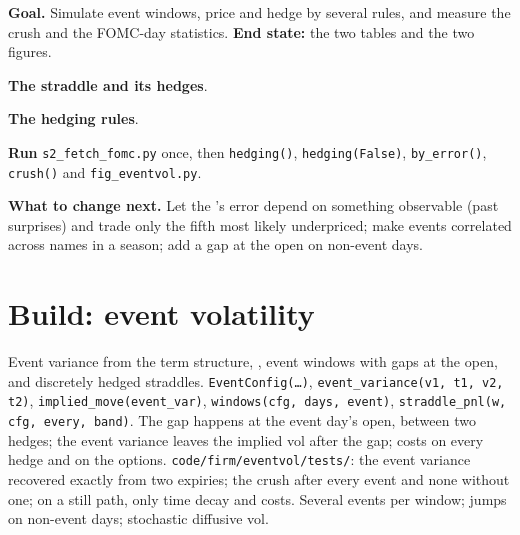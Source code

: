 \begin{tutorial}
\textbf{Goal.} Simulate event windows, price and hedge  by several rules, and measure the crush and the FOMC-day statistics.
\textbf{End state:} the two tables and the two figures.
\begin{tutsteps}
\item \textbf{The straddle and its hedges}.
\label{lst:s2:gamma-scalping-and-event-volatility:pnl}
\item \textbf{The hedging rules}.
\label{lst:s2:gamma-scalping-and-event-volatility:rules}
\item \textbf{Run} \texttt{s2\_fetch\_fomc.py} once, then \texttt{hedging()}, \texttt{hedging(False)}, \texttt{by\_error()}, \texttt{crush()} and
\texttt{fig\_eventvol.py}.
\end{tutsteps}
\textbf{What to change next.} Let the 's error depend on something observable (past surprises) and trade only the fifth most likely
underpriced; make events correlated across names in a season; add a gap at the open on non-event days.
\end{tutorial}

\section{Build: event volatility}\label{bld:s2:gamma-scalping-and-event-volatility:eventvol}

\begin{build}
 Event variance from the term structure, , event windows with gaps at the open, and discretely hedged straddles.
 \texttt{EventConfig(\dots)}, \texttt{event\_variance(v1, t1, v2, t2)}, \texttt{implied\_move(event\_var)}, \texttt{windows(cfg,
days, event)}, \texttt{straddle\_pnl(w, cfg, every, band)}.
 The gap happens at the event day's open, between two hedges; the event variance leaves the implied vol after the gap; costs on every
hedge and on the options.
 \texttt{code/firm/eventvol/tests/}: the event variance recovered exactly from two expiries; the crush after every event and
none without one; on a still path, only time decay and costs.
 Several events per window; jumps on non-event days; stochastic diffusive vol.
\end{build}


